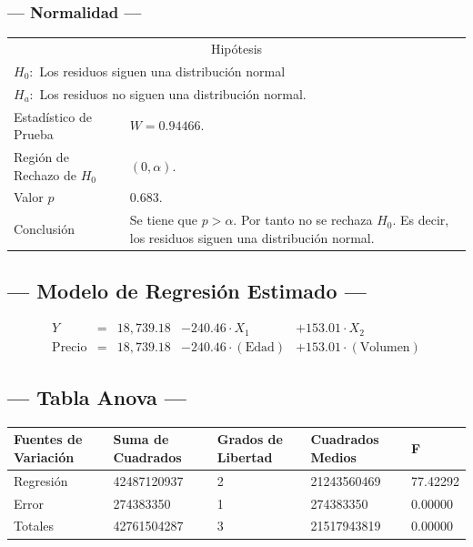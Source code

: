 \subsubsection{--- Normalidad ---} %
\begin{center}
  \begin{tabular}{|l|p{8cm}|}
    \cline{1-2}
    \multicolumn{2}{|c|}{Hipótesis}\\ \cline{1-2}
    \multicolumn{2}{|l|}{\(H_0:\) Los residuos siguen una distribución normal} \\ 
    \multicolumn{2}{|l|}{\(H_a:\) Los residuos no siguen una distribución normal.} \\ \cline{1-2}
    Estadístico de Prueba & \(W = 0.94466\).\\ \cline{1-2} 
		Región de Rechazo de \(H_0\) & \((0, \alpha )\).\\ \cline{1-2} 
    Valor \(p\) & \(0.683\).\\ \cline{1-2} 
    Conclusión & Se tiene que \(p> \alpha\). \newline 
		Por tanto no se rechaza \(H_0\). \newline 
		Es decir, los residuos siguen una distribución normal.\\ \cline{1-2} 
  \end{tabular}
\end{center}


\subsection{\centering --- Modelo de Regresión Estimado ---} %
\begin{align}
	Y & = &              18,739.18 & - 240.46 \cdot X_1           & + 153.01     \cdot X_2   \\[2mm]
	\mbox{Precio} & = &  18,739.18 & - 240.46 \cdot (\mbox{Edad}) & + 153.01     \cdot (\mbox{Volumen})
	\label{eq:3}
\end{align}

\subsection{\centering --- Tabla Anova ---} %
\begin{center}
  \begin{tabular}{|l|l|l|l|l|}
    \hline 
Fuentes de Variación  & Suma de Cuadrados & Grados de Libertad & Cuadrados Medios & F\\ \hline 
Regresión  &  42487120937          &  2     &  21243560469 & 77.42292 \\ \hline
Error      &    274383350          &  1     &    274383350 &  0.00000 \\ \hline
Totales    &  42761504287          &  3     &  21517943819 &  0.00000 \\ \hline
  \end{tabular}
\end{center} 

